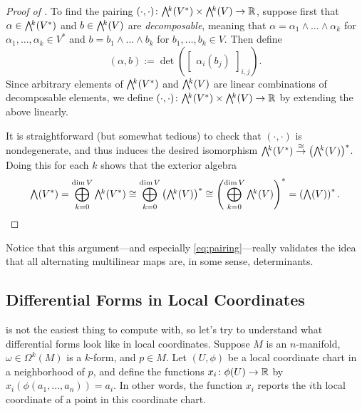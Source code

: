\begin{proof}[Proof of ]
	To find the pairing $(\cdot , \cdot ) \from \ext{k}(V^\ast) \times \ext{k} (V) \to \R$, suppose first that $\alpha \in \ext{k}(V^\ast)$ and $b \in \ext{k}(V)$ are \emph{decomposable}, meaning that $\alpha = \alpha_1 \wedge \dots \wedge \alpha_k$ for $\alpha_1 , \dots , \alpha_k \in V^\ast$ and $b = b_1 \wedge \dots \wedge b_k$ for $b_1, \dots , b_k \in V$. Then define
	\begin{equation}\label{eq:pairing}
		(\alpha, b) := \det \left( \begin{bmatrix} \alpha_i(b_j) \end{bmatrix}_{i,j}\right).
	\end{equation}
	Since arbitrary elements of $\ext{k}(V^\ast)$ and $\ext{k}(V)$ are linear combinations of decomposable elements, we define $(\cdot , \cdot ) \from \ext{k}(V^\ast) \times \ext{k} (V) \to \R$ by extending the above linearly. 
	
	It is straightforward (but somewhat tedious) to check that $(\cdot , \cdot)$ is nondegenerate, and thus induces the desired isomorphism $\ext{k}(V^\ast) \overset{\cong}{\to} \left(\ext{k}(V)\right)^\ast$. Doing this for each $k$ shows that the exterior algebra
	\[
		\ext{}(V^\ast) = \bigoplus_{k=0}^{\dim V} \ext{k}(V^\ast) \cong \bigoplus_{k=0}^{\dim V} \left(\ext{k}(V)\right)^\ast \cong \left( \bigoplus_{k=0}^{\dim V} \ext{k}(V)\right)^\ast = \left(\ext{}(V)\right)^\ast.
	\]
\end{proof}

Notice that this argument---and especially \eqref{eq:pairing}---really validates the idea that all alternating multilinear maps are, in some sense, determinants. 

\subsection{Differential Forms in Local Coordinates}
\label{sub:differential_forms_in_local_coordinates}

 is not the easiest thing to compute with, so let's try to understand what differential forms look like in local coordinates. Suppose $M$ is an $n$-manifold, $\omega \in \Omega^k(M)$ is a $k$-form, and $p \in M$. Let $(U,\phi)$ be a local coordinate chart in a neighborhood of $p$, and define the functions $x_i \colon\thinspace\! \phi(U) \to \mathbb{R}$ by $x_i(\phi(a_1, \dots , a_n)) = a_i$. In other words, the function $x_i$ reports the $i$th local coordinate of a point in this coordinate chart.

